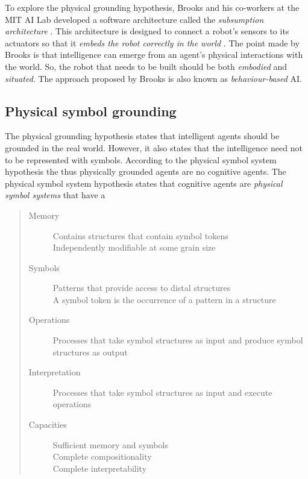 
To explore the physical grounding hypothesis, Brooks and his co-workers at the MIT AI Lab developed a software architecture called the {\em subsumption architecture} \citep{brooks:1986}. This architecture is designed to connect a robot's sensors to its actuators so that it {\em embeds the robot correctly in the world} \citep{brooks:1990}.  The point made by Brooks is that intelligence can emerge from an agent's physical interactions with the world. So, the robot that needs to be built should be both {\em embodied} and {\em situated}. The approach proposed by Brooks is also known as {\em behaviour-based} AI.


\subsection{Physical symbol grounding}

The physical grounding hypothesis \citep{brooks:1990} states that intelligent agents should be grounded in the real world. However, it also states that the intelligence need not to be represented with symbols. According to the physical symbol system hypothesis the thus physically grounded agents are no cognitive agents. The physical symbol system hypothesis \citep{newell:1980} states that cognitive agents are {\em physical symbol systems} that have a  \cite[77]{newell:1990}

\begin{quote}
\begin{description}
\item[Memory]
Contains structures that contain symbol tokens\\
Independently modifiable at some grain size

\item[Symbols]
Patterns that provide access to distal structures\\
A symbol token is the occurrence of a pattern in a structure

\item[Operations]
Processes that take symbol structures as input and produce symbol structures as output

\item[Interpretation]
Processes that take symbol structures as input and execute operations

\item[Capacities]
Sufficient memory and symbols\\
Complete compositionality\\
Complete interpretability
\end{description}
\end{quote}


